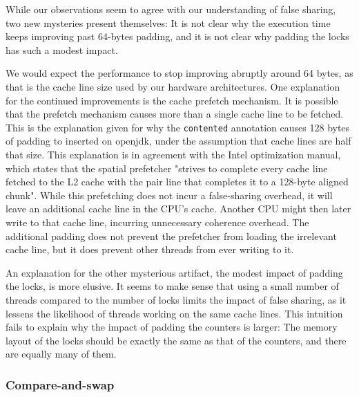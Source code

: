 While our observations seem to agree with our understanding of false sharing,
two new mysteries present themselves: It is not clear why the execution time
keeps improving past 64-bytes padding, and it is not clear why padding the locks
has such a modest impact.

We would expect the performance to stop improving abruptly around 64
bytes, as that is the cache line size used by our hardware architectures.
One explanation for the continued improvements is the cache prefetch mechanism.
It is possible that the prefetch mechanism causes more than a single cache line
to be fetched. This is the explanation given for why the \texttt{contented}
annotation causes 128 bytes of padding to inserted on openjdk, under the
assumption that cache lines are half that size\cite{openjdkmailcontended}.
This explanation is in agreement with the Intel optimization
manual\cite{inteloptimize}, which states that the spatial prefetcher
"strives to complete every cache line fetched to the L2 cache with the pair line
that completes it to a 128-byte aligned chunk"\footnotemark. While this
prefetching does not incur a false-sharing overhead, it will leave an additional
cache line in the CPU's cache. Another CPU might then later write to that
cache line, incurring unnecessary coherence overhead. The additional padding
does not prevent the prefetcher from loading the irrelevant cache line, but it
does prevent other threads from ever writing to it.

An explanation for the other mysterious artifact, the modest impact of padding
the locks, is more elusive. It seems to make sense that using a small number of
threads compared to the number of locks limits the impact of false sharing, as
it lessens the likelihood of threads working on the same cache lines. This
intuition fails to explain why the impact of padding the counters is larger: The
memory layout of the locks should be exactly the same as that of the counters,
and there are equally many of them.


\subsubsection{Compare-and-swap}


